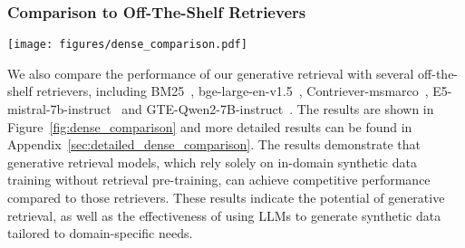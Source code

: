 \subsubsection{Comparison to Off-The-Shelf Retrievers}
\begin{figure*}[htbp]
    \centering
    \texttt{[image: figures/dense\_comparison.pdf]}
    \caption{Performance comparison between generative retrieval using semantic identifiers and off-the-shelf-retrieval models. We use HIT@4 for MultiHop-RAG and HIT@1 for other datasets as the evaluation metric. For the full experiment results, please refer to Appendix \ref{sec:detailed_dense_comparison} (Table \ref{tab:dense_retrieval_comparison}).}
    \label{fig:dense_comparison}
\end{figure*}
We also compare the performance of our generative retrieval with several off-the-shelf retrievers, including BM25~\citep{DBLP:conf/sigir/RobertsonW94}, bge-large-en-v1.5~\citep{bge_embedding},  Contriever-msmarco~\citep{izacard2021contriever},  E5-mistral-7b-instruct~\citep{wang-etal-2024-improving-text} and GTE-Qwen2-7B-instruct~\citep{li2023towards}. The results are shown in Figure~\ref{fig:dense_comparison} and more detailed results can be found in Appendix~\ref{sec:detailed_dense_comparison}. The results demonstrate that generative retrieval models, which rely solely on in-domain synthetic data training without retrieval pre-training, can achieve competitive performance compared to those retrievers.
These results indicate the potential of generative retrieval, as well as the effectiveness of using LLMs to generate synthetic data tailored to domain-specific needs.


